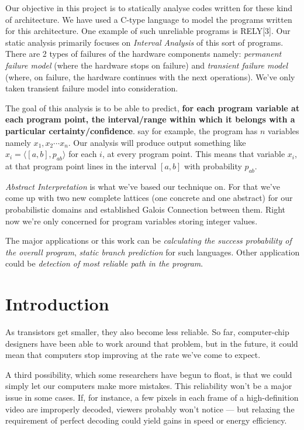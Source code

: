 \documentclass[final,3p, review, times]{Elsevier/elsarticle}
\begin{document}
Our objective in this project is to statically analyse codes written for these kind of architecture. We have used a C-type language to model the programs written for this architecture. One example of such unreliable programs is RELY[3]. Our static analysis primarily focuses on \textit{Interval Analysis} of this sort of programs.  There are 2 types of failures of the hardware components namely: \emph{permanent failure model} (where the hardware stops on failure) and \emph{transient failure model} (where, on failure, the hardware continues with the next operations). We've only taken transient failure model into consideration.

The goal of this analysis is to be able to predict, \textbf{for each program variable at each program point, the interval/range within which it belongs with a particular certainty/confidence}. say for example, the program has $n$ variables namely $x_1,x_2\cdots x_n$. Our analysis will produce output something like $x_i=\langle[a,b],p_{ab}\rangle$ for each $i$, at every program point. This means that variable $x_i$, at that program point lines in the interval $[a,b]$ with probability $p_{ab}$.

\emph{Abstract Interpretation} is what we've based our technique on. For that we've come up with two new complete lattices (one concrete and one abstract) for our probabilistic domains and established Galois Connection between them. Right now we're only concerned for program variables storing integer values.

The major applications or this work can be \emph{calculating the success probability of the overall program}, \emph{static branch prediction} for such languages. Other application could be \emph{detection of most reliable path in the program}.
\clearpage



\section{Introduction}

As transistors get smaller, they also become less reliable. So far, computer-chip designers have been able to work around that problem, but in the future, it could mean that computers stop improving at the rate we’ve come to expect.

A third possibility, which some researchers have begun to float, is that we could simply let our computers make more mistakes. This reliability won't be a major issue in some cases. If, for instance, a few pixels in each frame of a high-definition video are improperly decoded, viewers probably won’t notice --- but relaxing the requirement of perfect decoding could yield gains in speed or energy efficiency.
\end{document}
